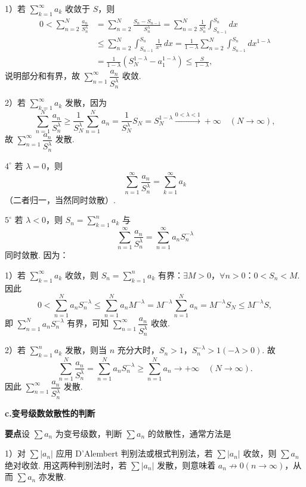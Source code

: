 \documentclass[UTF8,12pt,a4paper,fontset=fandol]{ctexart}
\begin{document}
1）若 $\displaystyle\sum_{k=1}^\infty a_k$ 收敛于 $S$，则
\[
\begin{aligned}
0<\sum_{n=2}^N\frac{a_n}{S_n^\lambda}
&=\sum_{n=2}^N\frac{S_n-S_{n-1}}{S_n^\lambda}
=\sum_{n=2}^N\frac1{S_n^\lambda}\int_{S_{n-1}}^{S_n}dx\\
&\le\sum_{n=2}^N\int_{S_{n-1}}^{S_n}\frac1{x^\lambda}\,dx
=\frac1{1-\lambda}\sum_{n=2}^N\int_{S_{n-1}}^{S_n}dx^{1-\lambda}\\
&=\frac1{1-\lambda}(S_N^{1-\lambda}-a_1^{1-\lambda})
\le\frac{S}{1-\lambda},
\end{aligned}
\]
说明部分和有界，故 $\displaystyle\sum_{n=1}^\infty\dfrac{a_n}{S_n^\lambda}$ 收敛.

2）若 $\displaystyle\sum_{k=1}^\infty a_k$ 发散，因为
\[
  \sum_{n=1}^N\frac{a_n}{S_n^\lambda}
  \ge\frac1{S_N^\lambda}\sum_{n=1}^N a_n
  =\frac1{S_N^\lambda}S_N
  =S_N^{1-\lambda}\stackrel{0<\lambda<1}{\longrightarrow}+\infty\quad(N\to\infty),
\]
故 $\displaystyle\sum_{n=1}^\infty\dfrac{a_n}{S_n^\lambda}$ 发散.

$4^\circ$ 若 $\lambda=0$，则
\[
  \sum_{n=1}^\infty\frac{a_n}{S_n^\lambda}
  =\sum_{k=1}^\infty a_k
\]
（二者归一，当然同时敛散）.

$5^\circ$ 若 $\lambda<0$，则 $S_n=\displaystyle\sum_{k=1}^n a_k$ 与
\[
  \sum_{n=1}^\infty\frac{a_n}{S_n^\lambda}
  =\sum_{n=1}^\infty a_nS_n^{-\lambda}
\]
同时敛散. 因为：

1）若 $\displaystyle\sum_{k=1}^\infty a_k$ 收敛，则 $S_n=\displaystyle\sum_{k=1}^n a_k$ 有界：$\exists M>0$，$\forall n>0$：$0<S_n<M$. 因此
\[
  0<\sum_{n=1}^N a_nS_n^{-\lambda}
  \le\sum_{n=1}^N a_nM^{-\lambda}
  =M^{-\lambda}\sum_{n=1}^N a_n
  =M^{-\lambda}S_N\le M^{-\lambda}S,
\]
即 $\displaystyle\sum_{n=1}^N a_nS_n^{-\lambda}$ 有界，可知 $\displaystyle\sum_{n=1}^\infty\dfrac{a_n}{S_n^\lambda}$ 收敛.

2）若 $\displaystyle\sum_{k=1}^n a_k$ 发散，则当 $n$ 充分大时，$S_n>1$，$S_n^{-\lambda}>1(-\lambda>0)$. 故
\[
  \sum_{n=1}^N\frac{a_n}{S_n^\lambda}
  =\sum_{n=1}^N a_nS_n^{-\lambda}
  \ge\sum_{n=1}^N a_n\to+\infty\quad(N\to\infty).
\]
因此 $\displaystyle\sum_{n=1}^\infty\dfrac{a_n}{S_n^\lambda}$ 发散.

\noindent\textbf{c.\quad 变号级数敛散性的判断}

\noindent\textbf{要点}\quad 设 $\sum a_n$ 为变号级数，判断 $\sum a_n$ 的敛散性，通常方法是

1）对 $\sum |a_n|$ 应用 D'Alembert 判别法或根式判别法，若 $\sum |a_n|$ 收敛，则 $\sum a_n$ 绝对收敛. 用这两种判别法时，若 $\sum |a_n|$ 发散，则意味着 $a_n\not\to0(n\to\infty)$，从而 $\sum a_n$ 亦发散.
\end{document}
